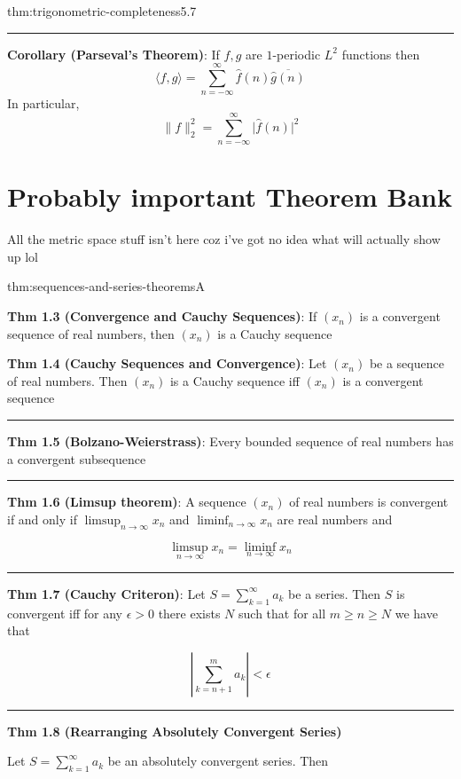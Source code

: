 \documentclass[landscape, 8pt]{extarticle}
\begin{document}
\begin{multicols}{3}
\begin{thm}{thm:trigonometric-completeness}{5.7}
	\noindent\rule{\textwidth}{0.2pt}
	\textbf{Corollary (Parseval's Theorem)}: If $f, g$ are $1$-periodic $L^{2}$ functions then
	\[\langle f, g \rangle = \sum_{n = -\infty}^{\infty} \widehat{f}(n) \overline{\widehat{g}(n)}\]
	In particular,
	\[\lVert f \rVert^{2}_{2} = \sum_{n = -\infty}^{\infty} \lvert \widehat{f}(n) \rvert^{2}\]
\end{thm}

\newpage

\section{Probably important Theorem Bank}
All the metric space stuff isn't here coz i've got no idea what will actually show up lol

\begin{thm}{thm:sequences-and-series-theorems}{A}
	
	\textbf{Thm 1.3 (Convergence and Cauchy Sequences)}: If $(x_{n})$ is a convergent sequence of real numbers, then $(x_{n})$ is a Cauchy sequence

	\textbf{Thm 1.4 (Cauchy Sequences and Convergence)}: Let $(x_{n})$ be a sequence of real numbers. Then $(x_{n})$ is a Cauchy sequence iff $(x_{n})$ is a convergent sequence

	\noindent\rule{\textwidth}{0.2pt}
	\textbf{Thm 1.5 (Bolzano-Weierstrass)}: Every bounded sequence of real numbers has a convergent subsequence


	\noindent\rule{\textwidth}{0.2pt}
	\textbf{Thm 1.6 (Limsup theorem)}: A sequence $(x_{n})$ of real numbers is convergent if and only if $\limsup_{n \to \infty}x_{n}$ and $\liminf_{n \to \infty}x_{n}$ are real numbers and

	\[\limsup_{n \to \infty} x_{n} = \liminf_{n \to \infty} x_{n}\]

	\noindent\rule{\textwidth}{0.2pt}

	\textbf{Thm 1.7 (Cauchy Criteron)}: Let $S=\sum_{k=1}^{\infty}a_{k}$ be a series. Then $S$ is convergent iff for any $\epsilon>0$ there exists $N$ such that for all $m\ge n\ge N$ we have that

	\vspace{-9pt}
	\[\left\lvert  \sum_{k=n+1}^{m} a_{k}  \right\rvert < \epsilon\]

	\noindent\rule{\textwidth}{0.2pt}

	\textbf{Thm 1.8 (Rearranging Absolutely Convergent Series)}

	Let $S=\sum_{k=1}^{\infty} a_{k}$ be an absolutely convergent series. Then


\end{thm}
\end{multicols}
\end{document}
